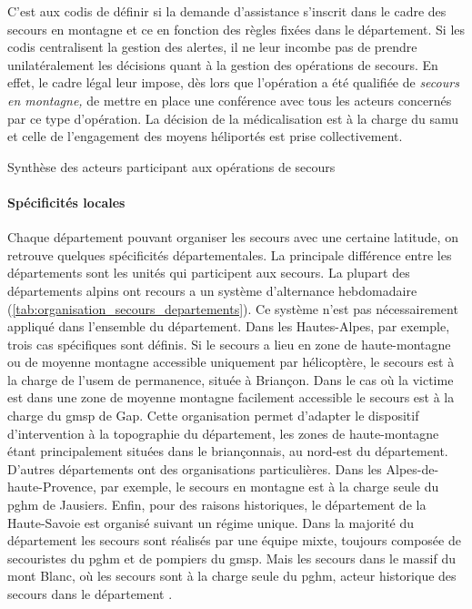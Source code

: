 C'est aux \ac{codis} de définir si la demande d'assistance s'inscrit
dans le cadre des secours en montagne et ce en fonction des règles
fixées dans le département.  Si les \ac{codis} centralisent la gestion
des alertes, il ne leur incombe pas de prendre unilatéralement les
décisions quant à la gestion des opérations de secours. En effet, le
cadre légal leur impose, dès lors que l’opération a été qualifiée de
\emph{secours en montagne,} de mettre en place une conférence avec
tous les acteurs concernés par ce type d'opération. La décision de la
médicalisation est à la charge du \ac{samu} et celle de l'engagement
des moyens héliportés est prise collectivement.

\begin{table}
  \centering
  
  \caption{Synthèse des acteurs participant aux opérations de secours}
  \label{tbl:org_sec}
\end{table}

\paragraph{Spécificités locales}

Chaque département pouvant organiser les secours avec une certaine
latitude, on retrouve quelques spécificités départementales. La
principale différence entre les départements sont les unités qui
participent aux secours. La plupart des départements alpins ont
recours a un système d'alternance hebdomadaire
(\autoref{tab:organisation_secours_departements}). Ce système n'est
pas nécessairement appliqué dans l'ensemble du département. Dans les
Hautes-Alpes, par exemple, trois cas spécifiques sont définis. Si le
secours a lieu en zone de haute-montagne ou de moyenne montagne
accessible uniquement par hélicoptère, le secours est à la charge de
l'\ac{usem} de permanence, située à Briançon. Dans le cas où la
victime est dans une zone de moyenne montagne facilement accessible le
secours est à la charge du \ac{gmsp} de Gap. Cette organisation permet
d'adapter le dispositif d’intervention à la topographie du
département, les zones de haute-montagne étant principalement situées
dans le briançonnais, au nord-est du département. D'autres
départements ont des organisations particulières. Dans les
Alpes-de-haute-Provence, par exemple, le secours en montagne est à la
charge seule du \ac{pghm} de Jausiers. Enfin, pour des raisons
historiques, le département de la Haute-Savoie est organisé suivant un
régime unique. Dans la majorité du département les secours sont
réalisés par une équipe mixte, toujours composée de secouristes du
\ac{pghm} et de pompiers du \ac{gmsp}. Mais les secours dans le massif
du mont Blanc, où les secours sont à la charge seule du \ac{pghm},
acteur historique des secours dans le département
\autocite{Halle2007,Boillot2017}.

